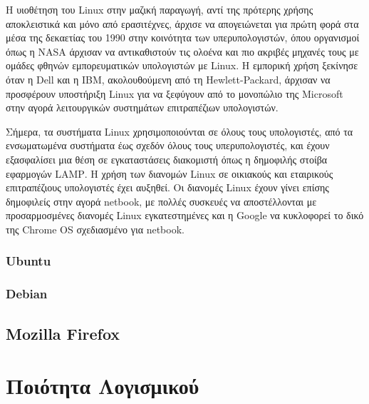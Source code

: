 \documentclass{article}
\begin{document}
{Η υιοθέτηση του Linux στην μαζική παραγωγή, αντί της πρότερης χρήσης αποκλειστικά και μόνο από ερασιτέχνες, άρχισε να απογειώνεται για πρώτη φορά στα μέσα της δεκαετίας του 1990 στην κοινότητα των υπερυπολογιστών, όπου οργανισμοί όπως η \textlatin{NASA} άρχισαν να αντικαθιστούν τις ολοένα και πιο ακριβές μηχανές τους με ομάδες φθηνών εμπορευματικών υπολογιστών με \textlatin{Linux}. Η εμπορική χρήση ξεκίνησε όταν η \textlatin{Dell} και η \textlatin{IBM}, ακολουθούμενη από τη \textlatin{Hewlett-Packard}, άρχισαν να προσφέρουν υποστήριξη \textlatin{Linux} για να ξεφύγουν από το μονοπώλιο της \textlatin{Microsoft} στην αγορά λειτουργικών συστημάτων επιτραπέζιων υπολογιστών.

Σήμερα, τα συστήματα \textlatin{Linux} χρησιμοποιούνται σε όλους τους υπολογιστές, από τα ενσωματωμένα συστήματα έως σχεδόν όλους τους υπερυπολογιστές, και έχουν εξασφαλίσει μια θέση σε εγκαταστάσεις διακομιστή όπως η δημοφιλής στοίβα εφαρμογών \textlatin{LAMP}. Η χρήση των διανομών \textlatin{Linux} σε οικιακούς και εταιρικούς επιτραπέζιους υπολογιστές έχει αυξηθεί. Οι διανομές \textlatin{Linux} έχουν γίνει επίσης δημοφιλείς στην αγορά netbook, με πολλές συσκευές να αποστέλλονται με προσαρμοσμένες διανομές \textlatin{Linux} εγκατεστημένες και η \textlatin{Google} να κυκλοφορεί το δικό της \textlatin{Chrome OS} σχεδιασμένο για \textlatin{netbook}.


\subsubsection{\textlatin{Ubuntu}}

\subsubsection{\textlatin{Debian}}

\subsection{\textlatin{Mozilla Firefox}}



\section{Ποιότητα Λογισμικού}
}
\end{document}
